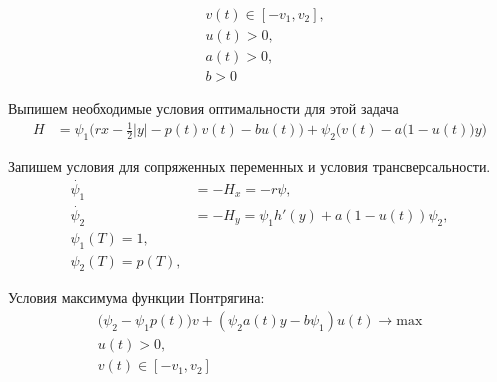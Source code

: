 \begin{align}
    & v(t) \in [-v_{1}, v_{2}], \\
    & u(t) > 0, \\
    & a(t) > 0,\\
    & b > 0
\end{align}

Выпишем необходимые условия оптимальности для этой задача\\
\begin{align}
    {H} & = \psi_{1} \Big (r x- \frac{1}{2}|y| - p(t) v(t) - b u(t) \Big ) + \psi_{2} \Big (v(t) - a \big (1-u(t) \big  )y\Big)
\end{align} 

Запишем условия для сопряженных переменных и условия трансверсальности.
\begin{align}
    \Dot{\psi_{1}} & = -H_x = -r \psi,\\
    \Dot{\psi_{2}} & = -H_y = \psi_{1} h'(y) + a(1-u(t))\psi_{2},\\
    {\psi_{1}(T)} = 1,\\
    {\psi_{2}(T)} = p(T),
\end{align} 

Условия максимума функции Понтрягина:\\
\begin{align}
     \big (\psi_{2} - \psi_{1} p(t) \big ) v + (\psi_{2} a(t) y - b \psi_{1})u(t)  \to \mathrm{max}\\
      u(t) > 0,\\
     v(t) \in [-v_{1}, v_{2}]
\end{align}



